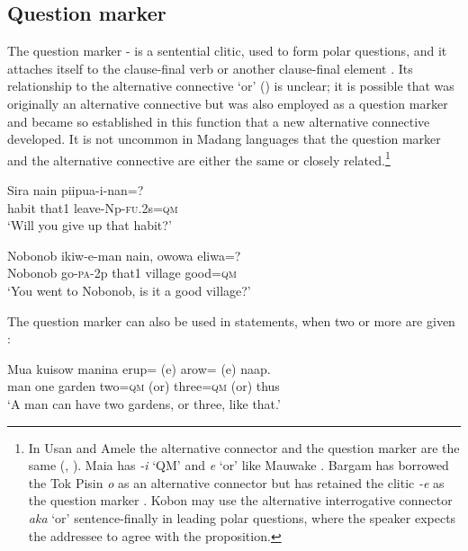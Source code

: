 \subsection{Question marker}\label{sec:3.12.8}
{}
The question marker - is a sentential clitic, used to form polar questions, and it attaches itself to the clause-final verb  or another clause-final element . Its relationship to the alternative connective  `or' () is unclear; it is possible that  was originally an alternative connective but was also employed as a question marker and became so established in this function that a new alternative connective  developed. It is not uncommon in  Madang languages that the question marker and the alternative connective are either the same or closely related.\footnote{In Usan and Amele the alternative connector and the question marker are the same (\citealt[293]{Reesink1987}, \citealt[99]{Roberts1987}). Maia has \textit{-i} `QM' and \textit{e} `or' like Mauwake \citep[83,159]{Hardin2002}. Bargam has borrowed the Tok Pisin \textit{o} as an alternative connector but has retained the clitic \textit{-e} as the question marker \citep[53,122]{Hepner2002}. Kobon may use the alternative interrogative connector \textit{aka} `or' sentence-finally in leading polar questions, where the speaker expects the addressee to agree with the proposition. } 

\ea%
\label{ex:3:x789}
\gll Sira nain piipua-i-nan=? \\
habit that1 leave-Np-\textsc{fu}.2s=\textsc{qm}\\
\glt`Will you give up that habit?'
\z

\ea%
\label{ex:3:x790}
\gll Nobonob ikiw-e-man nain, owowa eliwa=? \\
Nobonob go-\textsc{pa}-2p that1 village good=\textsc{qm}\\
\glt`You went to Nobonob, is it a good village?'
\z

The question marker can also be used in statements, when two or more  are given :

\ea%
\label{ex:3:x791}
\gll Mua kuisow manina erup= (e) arow= (e) naap. \\
man one garden two=\textsc{qm} (or) three=\textsc{qm} (or) thus\\
\glt`A man can have two gardens, or three, like that.'
\z

